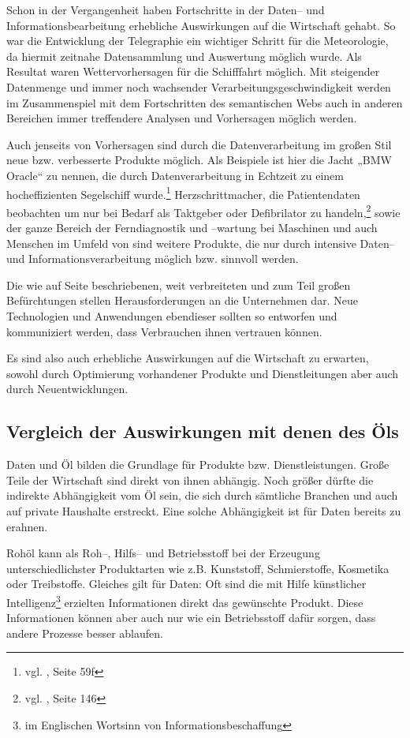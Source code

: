 Schon in der Vergangenheit haben Fortschritte in der Daten-- und Informationsbearbeitung erhebliche Auswirkungen auf die Wirtschaft gehabt. So war die Entwicklung der Telegraphie ein wichtiger Schritt für die Meteorologie, da hiermit zeitnahe Datensammlung und Auswertung möglich wurde. Als Resultat waren Wettervorhersagen für die Schiff{}fahrt möglich. Mit steigender Datenmenge und immer noch wachsender Verarbeitungsgeschwindigkeit werden im Zusammenspiel mit dem Fortschritten des semantischen Webs auch in anderen Bereichen immer treffendere Analysen und Vorhersagen möglich werden. 

Auch jenseits von Vorhersagen sind durch die Datenverarbeitung im großen Stil neue bzw. verbesserte Produkte möglich. Als Beispiele ist hier die Jacht „BMW Oracle“ zu nennen, die durch Datenverarbeitung in Echtzeit zu einem hocheffizienten Segelschiff wurde.\footnote{vgl. \cite{laudon}, Seite 59f} Herzschrittmacher, die Patientendaten beobachten um nur bei Bedarf als Taktgeber oder Defibrilator zu handeln,\footnote{vgl. \cite{froeling}, Seite 146} sowie der ganze Bereich der Ferndiagnostik und --wartung bei Maschinen und auch Menschen im Umfeld von  sind weitere Produkte, die nur durch intensive Daten-- und Informationsverarbeitung möglich bzw. sinnvoll werden.

Die wie auf Seite \pageref{probleme} beschriebenen, weit verbreiteten und zum Teil großen Befürchtungen stellen Herausforderungen an die Unternehmen dar. Neue Technologien und Anwendungen ebendieser sollten so entworfen und kommuniziert werden, dass Verbrauchen ihnen vertrauen können.

Es sind also auch erhebliche Auswirkungen auf die Wirtschaft zu erwarten, sowohl durch Optimierung vorhandener Produkte und Dienstleitungen aber auch durch Neuentwicklungen.

\subsection{Vergleich der Auswirkungen mit denen des Öls}
\label{vergleich}

Daten und Öl bilden die Grundlage für Produkte bzw. Dienstleistungen. Große Teile der Wirtschaft sind direkt von ihnen abhängig. Noch größer dürfte die indirekte Abhängigkeit vom Öl sein, die sich durch sämtliche Branchen und auch auf private Haushalte erstreckt. Eine solche Abhängigkeit ist für Daten bereits zu erahnen.

Rohöl kann als Roh--, Hilfs-- und Betriebsstoff bei der Erzeugung unterschiedlichster Produktarten wie z.B. Kunststoff, Schmierstoffe, Kosmetika oder Treibstoffe. Gleiches gilt für Daten: Oft sind die mit Hilfe künstlicher Intelligenz\footnote{im Englischen Wortsinn von Informationsbeschaffung} erzielten Informationen direkt das gewünschte Produkt. Diese Informationen können aber auch nur wie ein Betriebsstoff dafür sorgen, dass andere Prozesse besser ablaufen.

